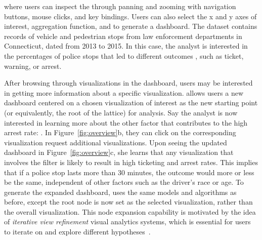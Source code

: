 where users can inspect the  
through panning and zooming with navigation buttons, 
mouse clicks, and key bindings. 
Users can also select the x and y axes of interest, 
aggregation function, and  
to generate a dashboard. 
The dataset contains records of vehicle and pedestrian stops from law enforcement departments in Connecticut, dated from 2013 to 2015. In this case, the analyst is interested in the percentages of police stops  that led to different outcomes , such as ticket, warning, or arrest. 

After browsing through visualizations in the dashboard, 
users may be interested in getting more information 
about a specific visualization. 
\system allows users  
a new dashboard centered on a chosen visualization 
of interest as the new starting point 
(or equivalently, the root of the lattice) 
for analysis. 
Say the analyst is now interested in learning more 
about the other factor that contributes to the high arrest rate: 
. 
In Figure~\ref{fig:overview}b, they 
can click on the corresponding visualization 
 request additional visualizations. 
Upon seeing the updated dashboard in Figure~\ref{fig:overview}c, 
she learns that any visualization 
that involves the  
filter is likely to result in high ticketing and arrest rates. 
This implies that if a police stop lasts more than 30 minutes, 
the outcome would more or less be the same, 
independent of other factors such as the driver's race or age. 
To generate the expanded dashboard, \system uses the same models 
and algorithms as before, 
except the root node is now set as the selected visualization, 
rather than the overall visualization. 
This node expansion capability is motivated 
by the idea of \textit{iterative view refinement} 
 visual analytics systems, 
which is essential for users to iterate on and 
explore different hypotheses~\cite{Hoque2017,Wongsuphasawat2016}.
